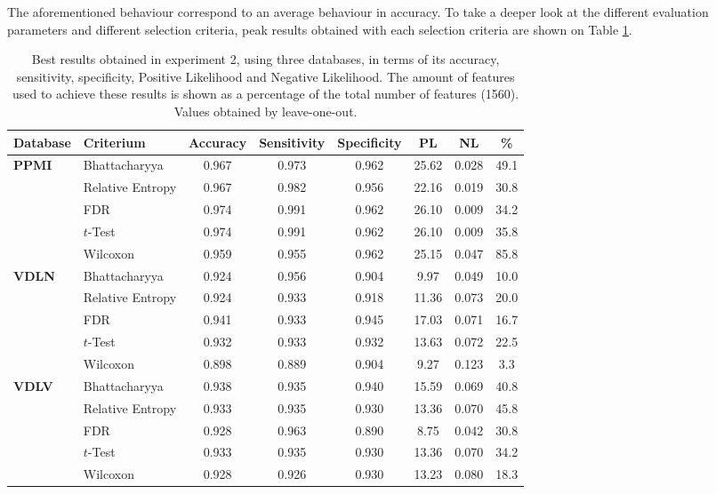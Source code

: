 The aforementioned behaviour correspond to an average behaviour in accuracy. To take a deeper look at the different evaluation parameters and different selection criteria, peak results obtained with each selection criteria are shown on Table \ref{tab:exp3Res}. 

\begin{table}[htp]
	\centering
	\begin{tabular}{llcccccc}
		Database 	 & Criterium	& Accuracy	& Sensitivity	& Specificity	& PL	& NL	& \% \\
		\hline \hline
		\multirow{5}{*}{\textbf{PPMI}}	& Bhattacharyya	& 0.967	& 0.973	& 0.962	& 25.62	& 0.028	& 49.1\\ %
		& Relative Entropy	& 0.967	& 0.982	& 0.956	& 22.16	& 0.019 & 30.8\\ %
		& FDR	& 0.974	& 0.991	& 0.962	& 26.10	& 0.009 & 34.2\\ %
		& $t$-Test	& 0.974	& 0.991	& 0.962	& 26.10	& 0.009 & 35.8\\ %
		& Wilcoxon	& 0.959	& 0.955	& 0.962	& 25.15	& 0.047 & 85.8\\ %
		\hline
		\multirow{5}{*}{\textbf{VDLN}} &  Bhattacharyya	& 0.924	& 0.956	& 0.904	& 9.97	& 0.049 & 10.0\\ %
		& Relative Entropy	& 0.924	& 0.933	& 0.918	& 11.36	& 0.073 & 20.0\\ %
		& FDR	& 0.941	& 0.933	& 0.945	& 17.03	& 0.071 & 16.7\\ %
		& $t$-Test	& 0.932	& 0.933	& 0.932	& 13.63	& 0.072 & 22.5\\ %
		& Wilcoxon	& 0.898	& 0.889	& 0.904	& 9.27	& 0.123 & 3.3\\ %
		\hline
		\multirow{5}{*}{\textbf{VDLV}}	& Bhattacharyya	& 0.938	& 0.935	& 0.940	& 15.59	& 0.069 & 40.8\\ %
		& Relative Entropy	& 0.933	& 0.935	& 0.930	& 13.36	& 0.070 & 45.8\\ %
		& FDR	& 0.928	& 0.963	& 0.890	& 8.75	& 0.042 & 30.8 \\ %
		& $t$-Test	& 0.933	& 0.935	& 0.930	& 13.36	& 0.070 & 34.2\\ %
		& Wilcoxon	& 0.928	& 0.926	& 0.930	& 13.23	& 0.080 & 18.3\\ %
		
		\hline\hline
	\end{tabular}
	\caption{Best results obtained in experiment 2, using three databases, in terms of its accuracy, sensitivity, specificity, Positive Likelihood and Negative Likelihood. The amount of features used to achieve these results is shown as a percentage of the total number of features (1560). Values obtained by leave-one-out.}
	\label{tab:exp3Res}
\end{table}

